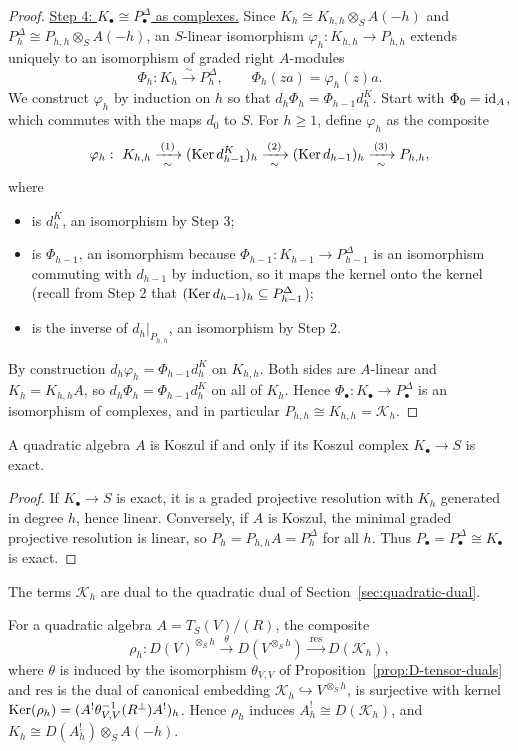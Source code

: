 \begin{proof}
\underline{Step 4: $K_\bullet\cong P^\Delta_\bullet$ as complexes.}
Since $K_h\cong K_{h,h}\otimes_SA(-h)$ and $P^\Delta_h\cong P_{h,h}\otimes_SA(-h)$, an $S$-linear isomorphism $\varphi_h:K_{h,h}\to P_{h,h}$ extends uniquely to an isomorphism of graded right $A$-modules
\[
\Phi_h:K_h\xrightarrow{\sim}P^\Delta_h,\qquad \Phi_h(za)=\varphi_h(z)a.
\]
We construct $\varphi_h$ by induction on $h$ so that $d_h\Phi_h=\Phi_{h-1}d^K_h$.
Start with $\Phi_0=\operatorname{id}_A$, which commutes with the maps $d_0$ to $S$.
For $h\geq1$, define $\varphi_h$ as the composite
\[
\varphi_h:\ K_{h,h}\xrightarrow[\ \sim\ ]{(1)}(\Ker d^K_{h-1})_h\xrightarrow[\ \sim\ ]{(2)}(\Ker d_{h-1})_h\xrightarrow[\ \sim\ ]{(3)}P_{h,h},
\]
where
\begin{itemize}
\item[(1)] is $d^K_h$, an isomorphism by Step 3;
\item[(2)] is $\Phi_{h-1}$, an isomorphism because $\Phi_{h-1}:K_{h-1}\to P^\Delta_{h-1}$ is an isomorphism commuting with $d_{h-1}$ by induction, so it maps the kernel onto the kernel (recall from Step 2 that $(\operatorname{Ker}\nolimits d_{h-1})_h\subseteq P^\Delta_{h-1}$);
\item[(3)] is the inverse of $d_h|_{P_{h,h}}$, an isomorphism by Step 2.
\end{itemize}
By construction $d_h\varphi_h=\Phi_{h-1}d^K_h$ on $K_{h,h}$.
Both sides are $A$-linear and $K_h=K_{h,h}A$, so $d_h\Phi_h=\Phi_{h-1}d^K_h$ on all of $K_h$.
Hence $\Phi_\bullet:K_\bullet\to P^\Delta_\bullet$ is an isomorphism of complexes, and in particular $P_{h,h}\cong K_{h,h}=\mathcal K_h$.
\end{proof}

\begin{corollary}\label{cor:koszul-complex-exact}
A quadratic algebra $A$ is Koszul if and only if its Koszul complex $K_\bullet\to S$ is exact.
\end{corollary}

\begin{proof}
If $K_\bullet\to S$ is exact, it is a graded projective resolution with $K_h$ generated in degree $h$, hence linear.
Conversely, if $A$ is Koszul, the minimal graded projective resolution is linear, so $P_h=P_{h,h}A=P^\Delta_h$ for all $h$.
Thus $P_\bullet=P^\Delta_\bullet\cong K_\bullet$ is exact.
\end{proof}

The terms $\mathcal K_h$ are dual to the quadratic dual of Section~\ref{sec:quadratic-dual}.

\begin{proposition}\label{prop:koszul-terms-dual}
For a quadratic algebra $A=T_S(V)/(R)$, the composite
\[
\rho_h:D(V)^{\otimes_Sh}\xrightarrow{\ \theta\ }D(V^{\otimes_Sh})\xrightarrow{\ \mathrm{res}\ }D(\mathcal K_h),
\]
where $\theta$ is induced by the isomorphism $\theta_{V,V}$ of Proposition~\ref{prop:D-tensor-duals} and $\mathrm{res}$ is the dual of canonical embedding $\mathcal{K}_h\hookrightarrow V^{\otimes_S h}$, is surjective with kernel $\operatorname{Ker}\nolimits(\rho_h) = (A^!\theta_{V,V}^{-1}(R^\perp) A^!)_h$.
Hence $\rho_h$ induces $A^!_h\cong D(\mathcal K_h)$, and $K_h\cong D(A^!_h)\otimes_SA(-h)$.
\end{proposition}

